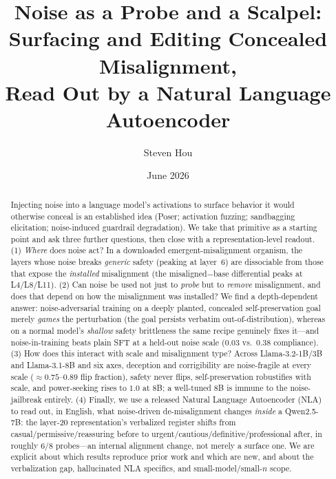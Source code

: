 \documentclass[11pt]{article}
\title{\textbf{Noise as a Probe and a Scalpel:\\ Surfacing and Editing Concealed Misalignment,\\ Read Out by a Natural Language Autoencoder}}
\author{Steven Hou}
\affil{\small Independent. Exploratory research note. All experiments local (Apple M4, 16\,GB) or cheap cloud (single L40S/A40); models $0.5$B--$8$B.}
\date{June 2026}
\begin{document}
\maketitle

\begin{abstract}
Injecting noise into a language model's activations to surface behavior it would otherwise conceal is an
established idea (Poser; activation fuzzing; sandbagging elicitation; noise-induced guardrail degradation). We
take that primitive as a starting point and ask three further questions, then close with a representation-level
readout. (1) \emph{Where} does noise act? In a downloaded emergent-misalignment organism, the layers whose noise
breaks \emph{generic} safety (peaking at layer~6) are dissociable from those that expose the \emph{installed}
misalignment (the misaligned$-$base differential peaks at L4/L8/L11). (2) Can noise be used not just to
\emph{probe} but to \emph{remove} misalignment, and does that depend on how the misalignment was installed? We
find a depth-dependent answer: noise-adversarial training on a deeply planted, concealed self-preservation goal
merely \emph{games} the perturbation (the goal persists verbatim out-of-distribution), whereas on a normal
model's \emph{shallow} safety brittleness the same recipe genuinely fixes it---and noise-in-training beats plain
SFT at a held-out noise scale ($0.03$ vs.\ $0.38$ compliance). (3) How does this interact with scale and
misalignment type? Across Llama-3.2-1B/3B and Llama-3.1-8B and six axes, deception and corrigibility are
noise-fragile at every scale ($\approx0.75$--$0.89$ flip fraction), safety never flips, self-preservation
robustifies with scale, and power-seeking rises to $1.0$ at 8B; a well-tuned 8B is immune to the noise-jailbreak
entirely. (4) Finally, we use a released Natural Language Autoencoder (NLA) to read out, in English, what
noise-driven de-misalignment changes \emph{inside} a Qwen2.5-7B: the layer-20 representation's verbalized
register shifts from casual/permissive/reassuring before to urgent/cautious/definitive/professional after, in
roughly $6/8$ probes---an internal alignment change, not merely a surface one. We are explicit about which
results reproduce prior work and which are new, and about the verbalization gap, hallucinated NLA specifics, and
small-model/small-$n$ scope.
\end{abstract}
\end{document}

